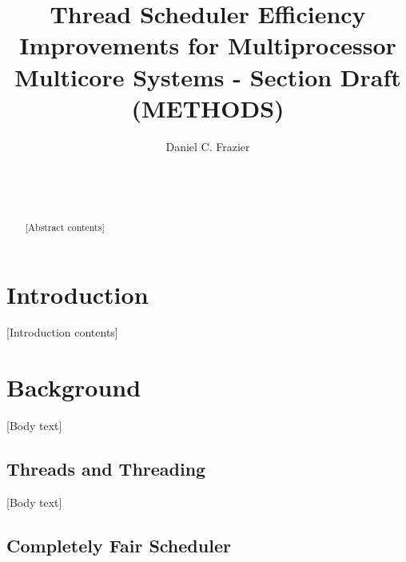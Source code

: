 \documentclass{sig-alternate}
\begin{document}

\title{Thread Scheduler Efficiency Improvements for Multiprocessor Multicore Systems - Section Draft (METHODS)}


\author{
\alignauthor
Daniel C. Frazier\\
	\\
	\\
	\\
}

\maketitle
\begin{abstract}
[Abstract contents]
\end{abstract}


\section{Introduction}
\label{sec:intro}

[Introduction contents]

\section{Background}
\label{sec:bg}

[Body text]

\subsection{Threads and Threading}
\label{sec:threads}

[Body text]

\subsection{Completely Fair Scheduler}
\label{sec:cfs}
\end{document}
